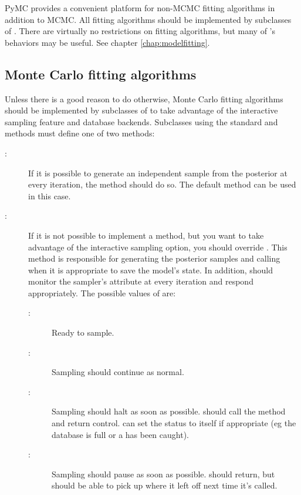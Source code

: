 PyMC provides a convenient platform for non-MCMC fitting algorithms in addition to MCMC. All fitting algorithms should be implemented by subclasses of . There are virtually no restrictions on fitting algorithms, but many of 's behaviors may be useful. See chapter \ref{chap:modelfitting}. 

\hypertarget{custom-MC}{}
\subsection{Monte Carlo fitting algorithms} \label{custom-MC}

Unless there is a good reason to do otherwise, Monte Carlo fitting algorithms should be implemented by subclasses of  to take advantage of the interactive sampling feature and database backends. Subclasses using the standard  and  methods must define one of two methods:
\begin{description}
   \item[:] If it is possible to generate an independent sample from the posterior at every iteration, the  method should do so. The default  method can be used in this case.
   \item[:] If it is not possible to implement a  method, but you want to take advantage of the interactive sampling option, you should override . This method is responsible for generating the posterior samples and calling  when it is appropriate to save the model's state. In addition,  should monitor the sampler's  attribute at every iteration and respond appropriately. The possible values of  are:
   \begin{description}
      \item[:] Ready to sample.
      \item[:] Sampling should continue as normal.
      \item[:] Sampling should halt as soon as possible.  should call the  method and return control.  can set the status to  itself if appropriate (eg the database is full or a  has been caught).
      \item[:] Sampling should pause as soon as possible.  should return, but should be able to pick up where it left off next time it's called.
   \end{description}
\end{description}

